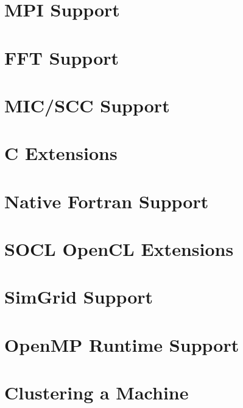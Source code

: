 \chapter{MPI Support}
\label{MPISupport}
\hypertarget{MPISupport}{}


\chapter{FFT Support}
\label{FFTSupport}
\hypertarget{FFTSupport}{}


\chapter{MIC/SCC Support}
\label{MICSCCSupport}
\hypertarget{MICSCCSupport}{}


\chapter{C Extensions}
\label{cExtensions}
\hypertarget{cExtensions}{}


\chapter{Native Fortran Support}
\label{NativeFortranSupport}
\hypertarget{NativeFortranSupport}{}


\chapter{SOCL OpenCL Extensions}
\label{SOCLOpenclExtensions}
\hypertarget{SOCLOpenclExtensions}{}


\chapter{SimGrid Support}
\label{SimGridSupport}
\hypertarget{SimGridSupport}{}


\chapter{OpenMP Runtime Support}
\label{OpenMPRuntimeSupport}
\hypertarget{OpenMPRuntimeSupport}{}


\chapter{Clustering a Machine}
\label{ClusteringAMachine}
\hypertarget{ClusteringAMachine}{}


